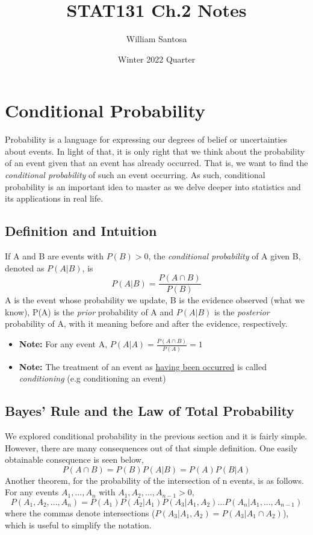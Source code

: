\documentclass[12pt, letterpaper]{article}
\title{STAT131 Ch.2 Notes}
\author{William Santosa}
\date{Winter 2022 Quarter}
\begin{document}
\maketitle

\section{Conditional Probability}

Probability is a language for expressing our degrees of belief or uncertainties about events. In light of that, it is only right
that we think about the probability of an event given that an event has already occurred. That is, we want to find the  \textit{conditional probability} 
of such an event occurring. As such, conditional probability is an important idea to master as we delve deeper into statistics and its applications in real life.

\subsection{Definition and Intuition}

If A and B are events with \(P(B) > 0\), the \textit{conditional probability} of A given B, denoted as \(P(A | B)\), is \[P(A | B) = \frac{P(A \cap B)}{P(B)} \]
A is the event whose probability we update, B is the evidence observed (what we know), P(A) is the \textit{prior} probability of A and \(P(A|B)\) is the \textit{posterior} probability of A, with it meaning before and after the evidence, respectively.
\begin{itemize}
    \item \textbf{Note:} For any event A, \(P(A|A) = \frac{P(A \cap B)}{P(A)} = 1\)
    \item \textbf{Note:} The treatment of an event as \underline{having been occurred} is called \textit{conditioning} (e.g conditioning an event)
\end{itemize}

\subsection{Bayes' Rule and the Law of Total Probability}

We explored conditional probability in the previous section and it is fairly simple. However, there are many consequences out of that simple definition.
One easily obtainable consequence is seen below, \[P(A \cap B) = P(B)P(A|B) = P(A)P(B|A)\]
Another theorem, for the probability of the intersection of n events, is as follows. For any events \(A_1, ..., A_n\) with \(A_1, A_2, ..., A_{n-1} > 0\), \[P(A_1, A_2, ..., A_n) = P(A_1)P(A_2|A_1)P(A_3|A_1,A_2)...P(A_n|A_1,...,A_{n-1})\]
where the commas denote intersections (\(P(A_3|A_1, A_2) = P(A_3 | A_1 \cap A_2)\)), which is useful to simplify the notation.
\end{document}
